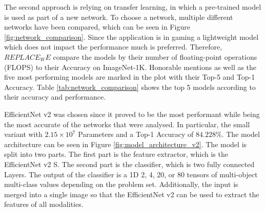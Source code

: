 The second approach is relying on transfer learning, in which a pre-trained model is used as part of a new network. To choose a network, multiple different networks have been compared, which can be seen in Figure \ref{fig:network_comparison}. Since the application is in gaming a lightweight model which does not impact the performance much is preferred. Therefore, $REPLACE_WE$ compare the models by their number of floating-point operations (FLOPS) to their Accuracy on ImageNet-1K. Honorable mentions as well as the five most performing models are marked in the plot with their Top-5 and Top-1 Accuracy. Table \ref{tab:network_comparison} shows the top 5 models according to their accuracy and performance. 


EfficientNet v2 was chosen since it proved to be the most performant while being the most accurate of the networks that were analysed. In particular, the small variant with $2.15 \times 10^7$ Parameters and a Top-1 Accuracy of $84.228\%$. The model architecture can be seen in Figure \ref{fig:model_architecture_v2}. The model is split into two parts. The first part is the feature extractor, which is the EfficientNet v2 S. The second part is the classifier, which is two fully connected Layers. The output of the classifier is a 1D 2, 4, 20, or 80 tensors of multi-object multi-class values depending on the problem set. Additionally, the input is merged into a single image so that the EfficientNet v2 can be used to extract the features of all modalities.

